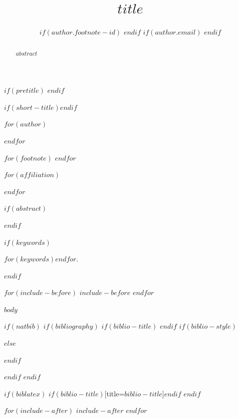 \documentclass[$for(classoption)$$classoption$$sep$,$endfor$]{jdsart}
\begin{document}
\begin{frontmatter}

$if(pretitle)$
$endif$

\title{$title$}
$if(short-title)$$endif$

$for(author)$
\author[$author.marker$]{%
$if(author.footnote-id)$
$endif$
$if(author.email)$
$endif$
}
$endfor$

$for(footnote)$
$endfor$

$for(affiliation)$
\address[$affiliation.marker$]{%
$if(affiliation.prefix)$$affiliation.prefix$, $endif$%
  , }
$endfor$

$if(abstract)$
\begin{abstract}
$abstract$
\end{abstract}
$endif$

$if(keywords)$
\begin{keywords}
$for(keywords)$$endfor$.
\end{keywords}
$endif$

\end{frontmatter}

$for(include-before)$
$include-before$
$endfor$

$body$

$if(natbib)$
$if(bibliography)$
$if(biblio-title)$
\renewcommand\refname{$biblio-title$}
$endif$
$if(biblio-style)$

$else$

$endif$

$endif$
$endif$

$if(biblatex)$
\printbibliography$if(biblio-title)$[title=$biblio-title$]$endif$
$endif$

$for(include-after)$
$include-after$
$endfor$
\end{document}
